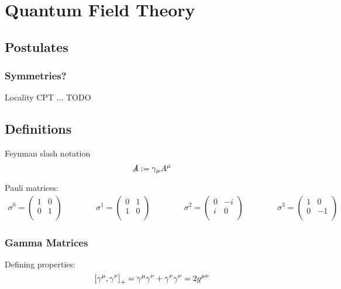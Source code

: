 \section{Quantum Field Theory} %
	\subsection{Postulates}
		\subsubsection{Symmetries?}
			Locality
			CPT
			...
			TODO
	\subsection{Definitions}
		Feynman slash notation
		\begin{equation}
			\slashed{A} := \gamma_\mu A^\mu
		\end{equation}

		\noindent
		Pauli matrices:
		\begin{equation}
			\begin{aligned}
				\sigma^0 = \left(\begin{matrix}
					1 & 0 \\
					0 & 1 \\
				\end{matrix}\right) &&\hspace{30pt}
				\sigma^1 = \left(\begin{matrix}
					0 & 1 \\
					1 & 0 \\
				\end{matrix}\right) &&\hspace{30pt}
				\sigma^2 = \left(\begin{matrix}
					0 & -i \\
						i & 0 \\
				\end{matrix}\right) &&\hspace{30pt}
				\sigma^3 = \left(\begin{matrix}
					1 & 0 \\
					0 & -1 \\
				\end{matrix}\right)
			\end{aligned}
		\end{equation}

		\subsubsection{Gamma Matrices}
			\noindent
			Defining properties:
			\begin{equation}
				\left[\gamma^\mu,\gamma^\nu\right]_{+} = \gamma^\mu \gamma^\nu + \gamma^\nu \gamma^\nu = 2g^{\mu\nu}
			\end{equation}

